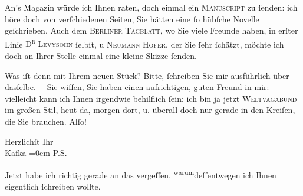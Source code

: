 \pstart
           An’s Magazin würde ich Ihnen raten, doch einmal
               ein \textsc{Manuscript} zu{ }ſenden: ich höre doch von verſchiedenen
               Seiten, Sie hätten eine{ }ſo hübſche Novelle geſchrieben. Auch dem {\pb}\textsc{Berliner Tagblatt}, wo Sie viele Freunde haben, in erſter Linie \textsc{D\textsuperscript{r}{ }Levysohn}{ }ſelbſt, u \textsc{Neumann Hofer}, der Sie{ }ſehr{ }ſchätzt, möchte ich doch an Ihrer Stelle einmal eine kleine
               Skizze{ }ſenden.\pend
           
\pstart
           Was iſt denn mit Ihrem neuen Stück? Bitte,{ }ſchreiben Sie mir ausführlich über
               dasſelbe. – Sie wiſſen, Sie haben einen aufrichtigen, guten Freund in mir: vielleicht
               kann ich Ihnen irgendwie behilflich{ }ſein: ich bin ja jetzt \textsc{Weltvagabund} im großen Stil, heut da, morgen dort, u. überall doch nur
               gerade in \uline{den} Kreiſen, die Sie brauchen. Alſo!\pend
           
\pstart
           Herzlichſt Ihr{\\[\baselineskip]}\spacefill\mbox{Kafka}\pend
           \leftskip=0em{}
\pstart
           \noindent{}{\pb}\textsc{P.S.}\pend
           
\pstart
           Jetzt habe ich richtig gerade an das vergeſſen, \substVorne{}\textsuperscript{warum}\substDazwischen{}deſſentwegen\substHinten{} ich Ihnen eigentlich{ }ſchreiben wollte.\pend
           
